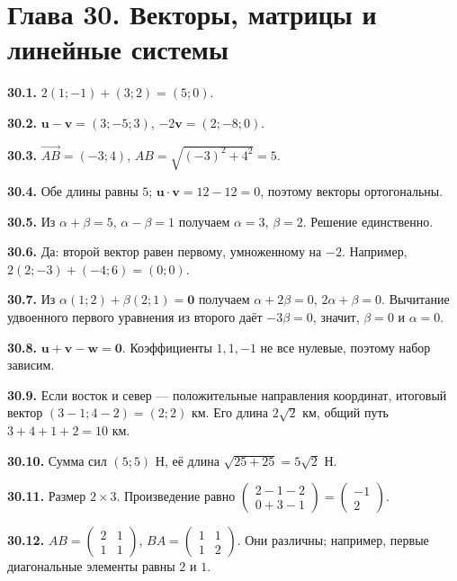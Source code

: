 \documentclass[12pt,a4paper,oneside,openany]{book}
\theoremstyle{colordef}\newtheorem{definition}{Определение}[chapter]
\theoremstyle{plain}\newtheorem{theorem}{Теорема}[chapter]
\theoremstyle{definition}\newtheorem{axiom}{Аксиома}[chapter]
\begin{document}
\section*{Глава 30. Векторы, матрицы и линейные системы}
\begingroup\setlength{\parskip}{3pt}
\textbf{30.1.} \(2(1;-1)+(3;2)=(5;0)\).\par
\textbf{30.2.} \(\symbf u-\symbf v=(3;-5;3)\), \(-2\symbf v=(2;-8;0)\).\par
\textbf{30.3.} \(\overrightarrow{AB}=(-3;4)\), \(AB=\sqrt{(-3)^2+4^2}=5\).\par
\textbf{30.4.} Обе длины равны \(5\); \(\symbf u\cdot\symbf v=12-12=0\), поэтому векторы ортогональны.\par
\textbf{30.5.} Из \(\alpha+\beta=5\), \(\alpha-\beta=1\) получаем \(\alpha=3\), \(\beta=2\). Решение единственно.\par
\textbf{30.6.} Да: второй вектор равен первому, умноженному на \(-2\). Например, \(2(2;-3)+(-4;6)=(0;0)\).\par
\textbf{30.7.} Из \(\alpha(1;2)+\beta(2;1)=\symbf0\) получаем \(\alpha+2\beta=0\), \(2\alpha+\beta=0\). Вычитание удвоенного первого уравнения из второго даёт \(-3\beta=0\), значит, \(\beta=0\) и \(\alpha=0\).\par
\textbf{30.8.} \(\symbf u+\symbf v-\symbf w=\symbf0\). Коэффициенты \(1,1,-1\) не все нулевые, поэтому набор зависим.\par
\textbf{30.9.} Если восток и север — положительные направления координат, итоговый вектор \((3-1;4-2)=(2;2)\) км. Его длина \(2\sqrt2\) км, общий путь \(3+4+1+2=10\) км.\par
\textbf{30.10.} Сумма сил \((5;5)\) Н, её длина \(\sqrt{25+25}=5\sqrt2\) Н.\par
\textbf{30.11.} Размер \(2\times3\). Произведение равно \(\begin{pmatrix}2-1-2\\0+3-1\end{pmatrix}=\begin{pmatrix}-1\\2\end{pmatrix}\).\par
\textbf{30.12.} \(AB=\begin{pmatrix}2&1\\1&1\end{pmatrix}\), \(BA=\begin{pmatrix}1&1\\1&2\end{pmatrix}\). Они различны; например, первые диагональные элементы равны \(2\) и \(1\).\par
\end{document}

